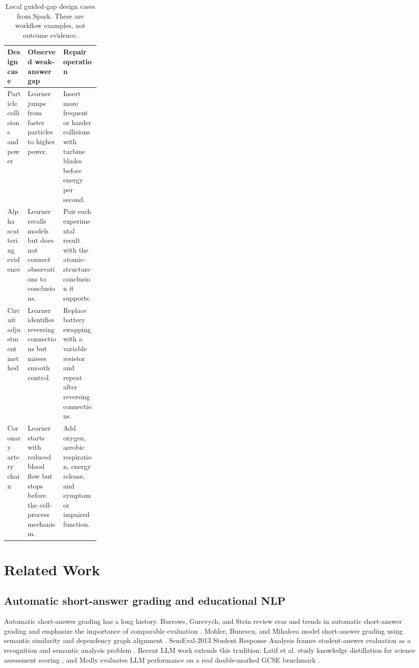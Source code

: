 \documentclass[11pt]{article}
\begin{document}
\begin{table}[H]
\centering
\small
\begin{tabularx}{\linewidth}{L{0.22\linewidth}Y Y}
\toprule
\textbf{Design case} & \textbf{Observed weak-answer gap} & \textbf{Repair operation}\\
\midrule
Particle collisions and power & Learner jumps from faster particles to higher power. & Insert more frequent or harder collisions with turbine blades before energy per second.\\
Alpha scattering evidence & Learner recalls models but does not connect observations to conclusions. & Pair each experimental result with the atomic-structure conclusion it supports.\\
Circuit adjustment method & Learner identifies reversing connections but misses smooth control. & Replace battery swapping with a variable resistor and repeat after reversing connections.\\
Coronary artery chain & Learner starts with reduced blood flow but stops before the cell-process mechanism. & Add oxygen, aerobic respiration, energy release, and symptom or impaired function.\\
\bottomrule
\end{tabularx}
\caption{Local guided-gap design cases from Spark. These are workflow examples, not outcome evidence.}
\label{tab:designcases}
\end{table}

\section{Related Work}

\subsection{Automatic short-answer grading and educational NLP}

Automatic short-answer grading has a long history. Burrows, Gurevych, and Stein review eras and trends in automatic short-answer grading and emphasize the importance of comparable evaluation \cite{burrows2015}. Mohler, Bunescu, and Mihalcea model short-answer grading using semantic similarity and dependency graph alignment \cite{mohler2011}. SemEval-2013 Student Response Analysis frames student-answer evaluation as a recognition and semantic analysis problem \cite{dzikovska2013}. Recent LLM work extends this tradition: Latif et al. study knowledge distillation for science assessment scoring \cite{latif2023}, and Medly evaluates LLM performance on a real double-marked GCSE benchmark \cite{fox2026}.
\end{document}
